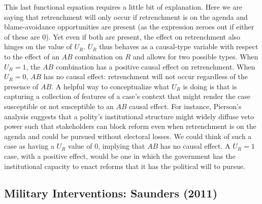 \documentclass[12pt,]{book}
\begin{document}
This last functional equation requires a little bit of explanation. Here we are saying that retrenchment will only occur if retrenchment is on the agenda and blame-avoidance opportunities are present (as the expression zeroes out if either of these are 0). Yet even if both are present, the effect on retrenchment also hinges on the value of \(U_R\). \(U_R\) thus behaves as a causal-type variable with respect to the effect of an \(AB\) combination on \(R\) and allows for two possible types. When \(U_R=1\), the \(AB\) combination has a positive causal effect on retrenchment. When \(U_R=0\), \(AB\) has no causal effect: retrenchment will not occur regardless of the presence of \(AB\). A helpful way to conceptualize what \(U_R\) is doing is that is capturing a collection of features of a case's context that might render the case susceptible or not susceptible to an \(AB\) causal effect. For instance, Pierson's analysis suggests that a polity's institutional structure might widely diffuse veto power such that stakeholders can block reform even when retrenchment is on the agenda and could be pursued without electoral losses. We could think of such a case as having a \(U_R\) value of 0, implying that \(AB\) has no causal effect. A \(U_R=1\) case, with a positive effect, would be one in which the government has the institutional capacity to enact reforms that it has the political will to pursue.

\hypertarget{military-interventions-saunders-2011}{%
\subsection{Military Interventions: Saunders (2011)}\label{military-interventions-saunders-2011}}
\end{document}

